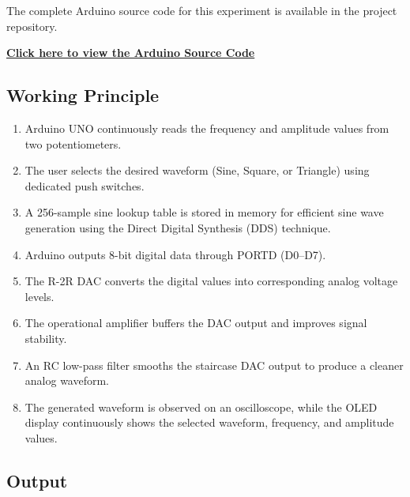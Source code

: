 The complete Arduino source code for this experiment is available in the project repository.

\href{https://github.com/YOUR_USERNAME/YOUR_REPOSITORY/blob/main/Exp-3/function_generator/function_generator.ino}
{\textbf{Click here to view the Arduino Source Code}}


\subsection{Working Principle}

\begin{enumerate}

\item Arduino UNO continuously reads the frequency and amplitude values from two potentiometers.

\item The user selects the desired waveform (Sine, Square, or Triangle) using dedicated push switches.

\item A 256-sample sine lookup table is stored in memory for efficient sine wave generation using the Direct Digital Synthesis (DDS) technique.

\item Arduino outputs 8-bit digital data through PORTD (D0--D7).

\item The R-2R DAC converts the digital values into corresponding analog voltage levels.

\item The operational amplifier buffers the DAC output and improves signal stability.

\item An RC low-pass filter smooths the staircase DAC output to produce a cleaner analog waveform.

\item The generated waveform is observed on an oscilloscope, while the OLED display continuously shows the selected waveform, frequency, and amplitude values.

\end{enumerate}


\subsection{Output}

